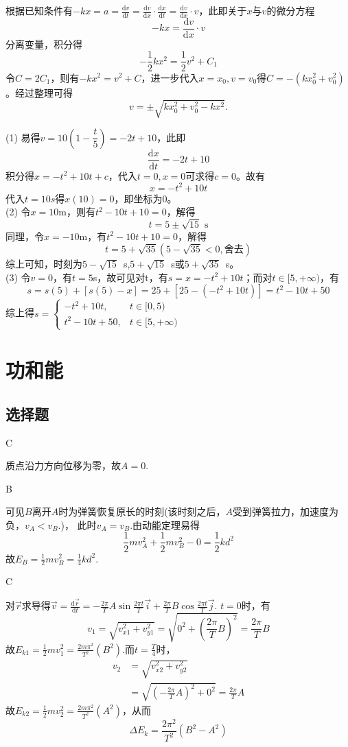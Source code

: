 \documentclass[b5paper,opensource,sourcefont,parskip]{qyxf-book}
\newcommand{\di}[1]{\mathrm{d}#1}
\newcommand{\dy}[2]{\frac{\di{#1}}{\di{#2}}}
\begin{document}

\solve 根据已知条件有$-kx=a=\dy{v}{t}=\dy{v}{x}\cdot \dy{x}{t}=\dy{v}{x}\cdot v$，此即关于$x$与$v$的微分方程
\[-kx=\dy{v}{x}\cdot v\]
分离变量，积分得
\[-\dfrac{1}{2}kx^2=\dfrac{1}{2}v^2+C_1\]
令$C=2C_1$，则有$-kx^2=v^2+C$，进一步代入$x=x_0,v=v_0$得$C=-(kx_0^2+v_0^2)$。经过整理可得
\[v=\pm\sqrt{kx_0^2+v_0^2-kx^2}.\]



\solve (1) 易得$v=10\left(1-\dfrac{t}{5}\right)=-2t+10$，此即
\[
\dy{x}{t}=-2t+10
\]
积分得$x=-t^2+10t+c$，代入$t=0,x=0$可求得$c=0$。故有
\[x=-t^2+10t\]
代入$t=10s$得$x(10)=0$，即坐标为0。\\
(2) 令$x=10$m，则有$t^2-10t+10=0$，解得
\[t=5\pm\sqrt{15}\text{ s}\]
同理，令$x=-10$m，有$t^2-10t+10=0$，解得
\[t=5+\sqrt{35}(5-\sqrt{35}<0,\text{舍去})\]
综上可知，时刻为$5-\sqrt{15}$\ s,$5+\sqrt{15}$\ s或$5+\sqrt{35}$\ s。\\
(3) 令$v=0$，有$t=5$s，故可见对t\in[0,5]，有$s=x=-t^2+10t$；而对$t\in[5,+\infty)$，有
\[s=s(5)+[s(5)-x]=25+[25-(-t^2+10t)]=t^2-10t+50\]
综上得$s=
\begin{cases}
-t^2+10t,&t\in[0,5)\\
t^2-10t+50,&t\in[5,+\infty)
\end{cases}$

\chapter{功和能}
\section{选择题}

C

\solve 质点沿力方向位移为零，故$A=0$.

B

\solve 可见$B$离开$A$时为弹簧恢复原长的时刻(该时刻之后，$A$受到弹簧拉力，加速度为负，$v_A<v_B$.)，
此时$v_A=v_B$.由动能定理易得
\[\frac{1}{2}mv_A^2+\frac{1}{2}mv_B^2-0=\frac{1}{2}kd^2\]
故$E_B=\frac{1}{2}mv_B^2=\frac{1}{4}kd^2$.


C

\solve 对$\vec{r}$求导得$\vec{v}=\frac{\di{\vec{r}}}{\di{t}}=-\frac{2\pi}{T}A\sin\frac{2\pi t}{T}\vec{i}+\frac{2\pi}{T}B\cos\frac{2\pi t}{T}\vec{j}$.
$t=0$时，有
\[
v_1=\sqrt{v_{x1}^2+v_{y1}^2}=\sqrt{0^2+\left(\frac{2\pi}{T}B\right)^2}=\frac{2\pi}{T}B
\]
故$E_{k1}=\frac{1}{2}mv_1^2=\frac{2m\pi^2}{T^2}\left(B^2\right)$.而$t=\frac{T}{4}$时，
\begin{align*}
v_2&=\sqrt{v_{x2}^2+v_{y2}^2}\\
&=\sqrt{\left(-\frac{2\pi}{T}A\right)^2+0^2}=\frac{2\pi}{T}A
\end{align*}
故$E_{k2}=\frac{1}{2}mv_2^2=\frac{2m\pi^2}{T^2}\left(A^2\right)$，从而
\[\Delta{}E_k=\frac{2\pi^2}{T^2}(B^2-A^2)\]
\end{document}
